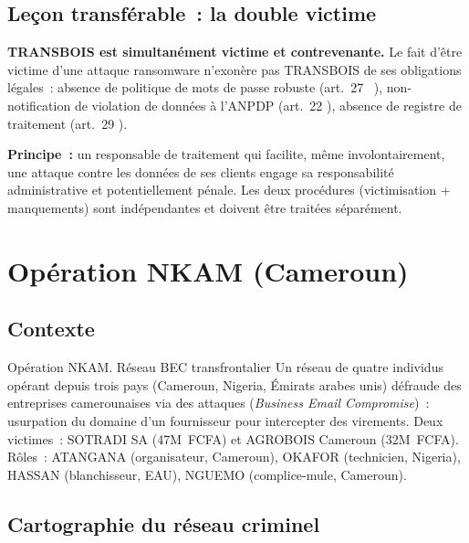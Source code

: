 \subsection{Leçon transférable~: la double victime}

\begin{boxalert}
\textbf{TRANSBOIS est simultanément victime et contrevenante.} Le fait
d'être victime d'une attaque ransomware n'exonère pas TRANSBOIS de ses
obligations légales~: absence de politique de mots de passe robuste (art.~27
~\cite{cameroun2024donnees}), non-notification de violation de données à l'ANPDP
(art.~22 ), absence de registre de traitement (art.~29
).

\textbf{Principe~:} un responsable de traitement qui facilite, même
involontairement, une attaque contre les données de ses clients engage
sa responsabilité administrative et potentiellement pénale. Les deux
procédures (victimisation + manquements) sont indépendantes et doivent
être traitées séparément.
\end{boxalert}

\section{Opération NKAM (Cameroun)}
\label{sec:wouri}

\subsection{Contexte}

\begin{boxscenario}{Opération NKAM. Réseau BEC transfrontalier}
Un réseau de quatre individus opérant depuis trois pays (Cameroun,
Nigeria, Émirats arabes unis) défraude des entreprises camerounaises via des
attaques  (\textit{Business Email Compromise})~: usurpation
du domaine d'un fournisseur pour intercepter des virements. Deux victimes~:
SOTRADI SA (47M~FCFA) et AGROBOIS Cameroun (32M~FCFA). Rôles~:
ATANGANA (organisateur, Cameroun), OKAFOR (technicien, Nigeria),
HASSAN (blanchisseur, EAU), NGUEMO (complice-mule, Cameroun).
\end{boxscenario}

\subsection{Cartographie du réseau criminel}

